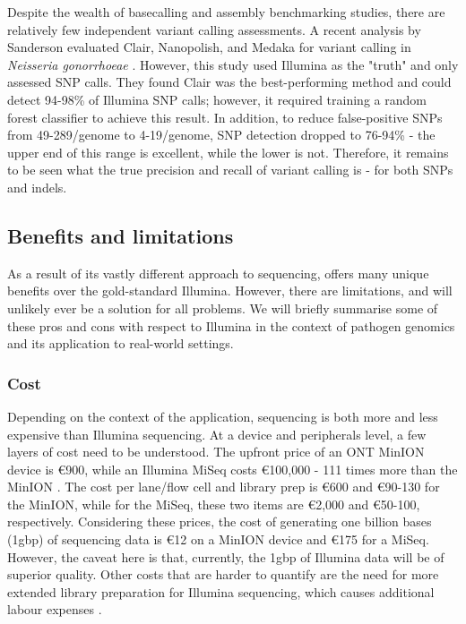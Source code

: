 Despite the wealth of \ont{} basecalling \cite{wick2019} and assembly \cite{wick2020} benchmarking studies, there are relatively few independent variant calling assessments. A recent analysis by Sanderson \etal{} evaluated Clair, Nanopolish, and Medaka for variant calling in \textit{Neisseria gonorrhoeae} \cite{sanderson2020}. However, this study used Illumina as the "truth" and only assessed SNP calls. They found Clair was the best-performing method and could detect 94-98\% of Illumina SNP calls; however, it required training a random forest classifier to achieve this result. In addition, to reduce false-positive SNPs from 49-289/genome to 4-19/genome, SNP detection dropped to 76-94\% - the upper end of this range is excellent, while the lower is not. Therefore, it remains to be seen what the true precision and recall of \ont{} variant calling is - for both SNPs and indels.

\subsection{Benefits and limitations}
\label{sec:ont-benefits}

As a result of its vastly different approach to sequencing, \ont{} offers many unique benefits over the gold-standard Illumina. However, there are limitations, and \ont{} will unlikely ever be a solution for all problems. We will briefly summarise some of these pros and cons with respect to Illumina in the context of pathogen genomics and its application to real-world settings.

\subsubsection{Cost}
Depending on the context of the application, \ont{} sequencing is both more and less expensive than Illumina sequencing. At a device and peripherals level, a few layers of cost need to be understood. The upfront price of an ONT MinION device is \euro900, while an Illumina MiSeq costs \euro100,000 - 111 times more than the MinION \cite{Tedersoo2021}. The cost per lane/flow cell and library prep is \euro600 and \euro90-130 for the MinION, while for the MiSeq, these two items are \euro2,000 and \euro50-100, respectively. Considering these prices, the cost of generating one billion bases (1gbp) of sequencing data is \euro12 on a MinION device and \euro175 for a MiSeq. However, the caveat here is that, currently, the 1gbp of Illumina data will be of superior quality. Other costs that are harder to quantify are the need for more extended library preparation for Illumina sequencing, which causes additional labour expenses \cite{Tedersoo2021}.


